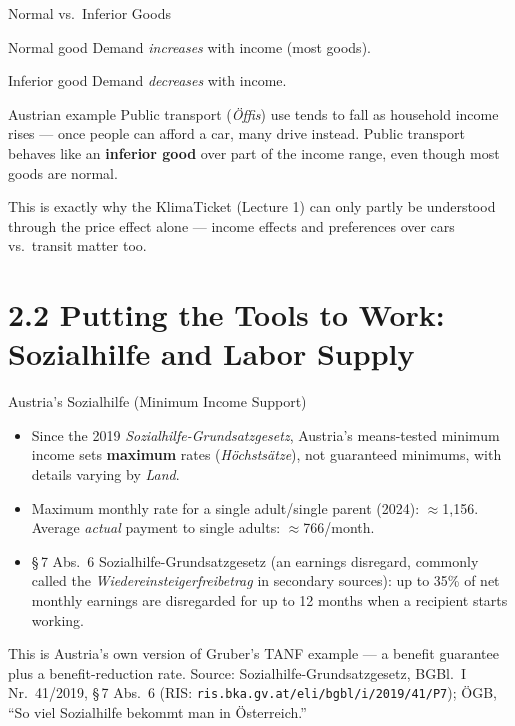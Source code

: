 \documentclass[11pt,aspectratio=169]{beamer}
\newcommand{\srcnote}[1]{{\footnotesize\color{wugray}Source: #1}}
\begin{document}
\begin{frame}{Normal vs.\ Inferior Goods}
  \begin{block}{Normal good}
    Demand \emph{increases} with income (most goods).
  \end{block}
  \begin{block}{Inferior good}
    Demand \emph{decreases} with income.
  \end{block}
  \vspace{0.5em}
  \begin{alertblock}{Austrian example}
    Public transport (\emph{Öffis}) use tends to fall as household income rises --- once people can afford a car, many drive instead. Public transport behaves like an \textbf{inferior good} over part of the income range, even though most goods are normal.
  \end{alertblock}
  \centering \small
  This is exactly why the KlimaTicket (Lecture 1) can only partly be understood through the price effect alone --- income effects and preferences over cars vs.\ transit matter too.
\end{frame}

\section{2.2 Putting the Tools to Work: Sozialhilfe and Labor Supply}

\begin{frame}{Austria's Sozialhilfe (Minimum Income Support)}
  \begin{itemize}
    \item Since the 2019 \emph{Sozialhilfe-Grundsatzgesetz}, Austria's means-tested minimum income sets \textbf{maximum} rates (\emph{Höchstsätze}), not guaranteed minimums, with details varying by \emph{Land}.
    \item Maximum monthly rate for a single adult/single parent (2024): \(\approx\)\texteuro{}1{,}156. Average \emph{actual} payment to single adults: \(\approx\)\texteuro{}766/month.
    \item \S\,7 Abs.\ 6 Sozialhilfe-Grundsatzgesetz (an earnings disregard, commonly called the \emph{Wiedereinsteigerfreibetrag} in secondary sources): up to 35\% of net monthly earnings are disregarded for up to 12 months when a recipient starts working.
  \end{itemize}
  \vspace{0.3em}
  \centering
  This is Austria's own version of Gruber's TANF example --- a benefit guarantee plus a benefit-reduction rate.
  \srcnote{Sozialhilfe-Grundsatzgesetz, BGBl.\ I Nr.\ 41/2019, \S\,7 Abs.\ 6 (RIS: \texttt{ris.bka.gv.at/eli/bgbl/i/2019/41/P7}); ÖGB, ``So viel Sozialhilfe bekommt man in Österreich.''}
\end{frame}
\end{document}
